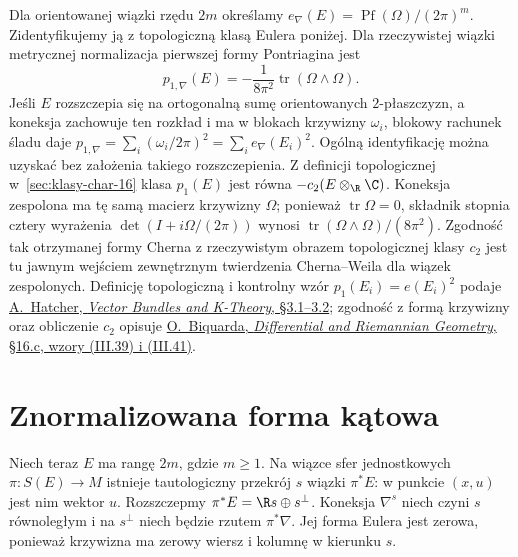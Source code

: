 \begin{przyklad}
\label{prz:euler-p1-CW-26}
Dla orientowanej wiązki rzędu $2m$ określamy
$e_\nabla(E)=\operatorname{Pf}(\Omega)/(2\pi)^m$.
Zidentyfikujemy ją z topologiczną klasą
Eulera poniżej. Dla rzeczywistej wiązki
metrycznej normalizacja pierwszej formy
Pontriagina jest
\[
 p_{1,\nabla}(E)=
 -\frac{1}{8\pi^2}\operatorname{tr}
                (\Omega\wedge\Omega).
\]
Jeśli $E$ rozszczepia się na ortogonalną
sumę orientowanych $2$-płaszczyzn,
a koneksja zachowuje ten rozkład
i ma w blokach krzywizny $\omega_i$, blokowy
rachunek śladu daje
$p_{1,\nabla}=\sum_i(\omega_i/2\pi)^2
=\sum_i e_\nabla(E_i)^2$.
Ogólną identyfikację można uzyskać bez
założenia takiego rozszczepienia. Z definicji
topologicznej w~\ref{sec:klasy-char-16}
klasa $p_1(E)$ jest równa
$-c_2(E\otimes_\R\C)$. Koneksja zespolona
ma tę samą macierz krzywizny $\Omega$;
ponieważ $\operatorname{tr}\Omega=0$,
składnik stopnia cztery wyrażenia
$\det(I+i\Omega/(2\pi))$ wynosi
$\operatorname{tr}(\Omega\wedge\Omega)/(8\pi^2)$.
Zgodność tak otrzymanej formy Cherna
z rzeczywistym obrazem topologicznej klasy
$c_2$ jest tu jawnym wejściem zewnętrznym
twierdzenia Cherna--Weila dla wiązek zespolonych.
Definicję topologiczną i kontrolny wzór
$p_1(E_i)=e(E_i)^2$ podaje
\href{https://pi.math.cornell.edu/~hatcher/VBKT/VB.pdf}
{A.\ Hatcher, \emph{Vector Bundles and K-Theory},
§3.1--3.2}; zgodność z formą krzywizny
oraz obliczenie $c_2$ opisuje
\href{https://webusers.imj-prg.fr/~olivier.biquard/m2dg2022.pdf}
{O.\ Biquarda, \emph{Differential and Riemannian Geometry},
§16.c, wzory (III.39) i (III.41)}.
\end{przyklad}

\section{Znormalizowana forma kątowa}
\label{sec:angular-form-26}

Niech teraz $E$ ma rangę $2m$, gdzie $m\geq1$.
Na wiązce sfer jednostkowych
$\pi:S(E)\to M$ istnieje
tautologiczny przekrój $s$ wiązki
$\pi^*E$: w punkcie $(x,u)$
jest nim wektor $u$.
Rozszczepmy
$\pi^*E=\R s\oplus s^\perp$.
Koneksja $\nabla^s$ niech czyni
$s$ równoległym i na $s^\perp$
niech będzie rzutem $\pi^*\nabla$.
Jej forma Eulera jest zerowa,
ponieważ krzywizna ma zerowy
wiersz i kolumnę w kierunku $s$.

